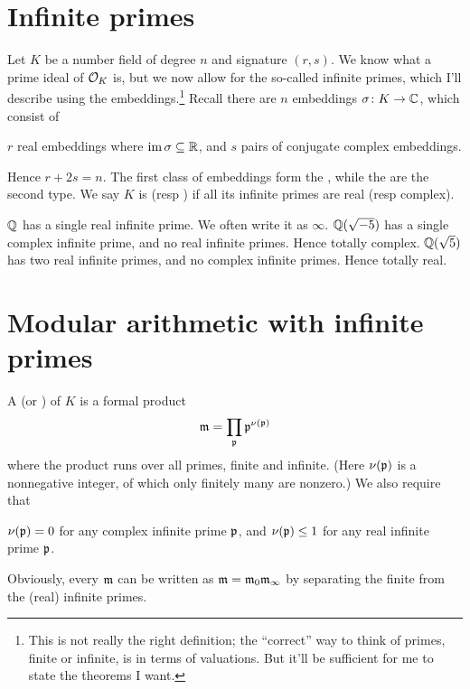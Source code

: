 \section{Infinite primes}
Let $K$ be a number field of degree $n$ and signature $(r,s)$.
We know what a prime ideal of $\mathcal O_K$ is,
but we now allow for the so-called infinite primes,
which I'll describe using the embeddings.\footnote{This is
	not really the right definition; the ``correct'' way to think of
	primes, finite or infinite, is in terms of valuations.
	But it'll be sufficient for me to state the theorems I want.}
Recall there are $n$ embeddings $\sigma \colon K \to \mathbb C$, which consist of
\begin{itemize}
	\ii $r$ real embeddings where $\operatorname{im}\sigma \subseteq \mathbb R$, and
	\ii $s$ pairs of conjugate complex embeddings.
\end{itemize}
Hence $r+2s = n$.
The first class of embeddings form the ,
while the  are the second type.
We say $K$ is  (resp )
if all its infinite primes are real (resp complex).
\begin{example}
	\listhack
	\begin{itemize}
		\ii $\mathbb Q$ has a single real infinite prime.
		We often write it as $\infty$.
		\ii $\mathbb Q(\sqrt{-5})$ has a single complex infinite prime,
		and no real infinite primes. Hence totally complex.
		\ii $\mathbb Q(\sqrt{5})$ has two real infinite primes,
		and no complex infinite primes. Hence totally real.
	\end{itemize}
\end{example}

\section{Modular arithmetic with infinite primes}
A  (or ) of $K$ is a formal product
\[ \mathfrak m = \prod_{\mathfrak p} \mathfrak p^{\nu(\mathfrak p)} \]
where the product runs over all primes, finite and infinite.
(Here $\nu(\mathfrak p)$ is a nonnegative integer,
of which only finitely many are nonzero.)
We also require that
\begin{itemize}
	\ii $\nu(\mathfrak p) = 0$ for any complex infinite prime $\mathfrak p$, and
	\ii $\nu(\mathfrak p) \le 1$ for any real infinite prime $\mathfrak p$.
\end{itemize}
Obviously, every $\mathfrak m$ can be written as $\mathfrak m = \mathfrak m_0\mathfrak m_\infty$
by separating the finite from the (real) infinite primes.

